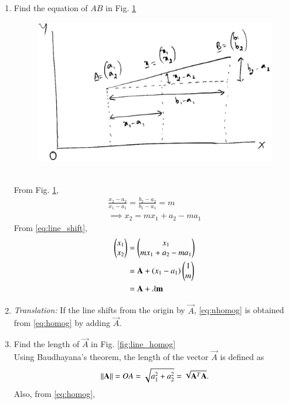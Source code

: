\begin{enumerate}[label=\arabic*.,ref=\thesubsection.\theenumi]
\item Find the equation of $AB$ in Fig. \ref{fig:line_nhomog}
\begin{figure}
\centering
\includegraphics[width=\columnwidth]{./figs/line_nhomog.eps}
\caption{}
\label{fig:line_nhomog}
\end{figure}
\\
\solution 
From Fig. \ref{fig:line_nhomog}, 
%
\begin{align}
\frac{x_2-a_2}{x_1-a_1} = \frac{b_2-a_2}{b_1-a_1} = m
\\
\implies x_2 = m x_1 + a_2-ma_1
\label{eq:line_shift}
\end{align}
%
From \eqref{eq:line_shift},
\begin{align}
\begin{pmatrix}x_1 \\ x_2\end{pmatrix} &= 
\begin{pmatrix}x_1 \\   m x_1 + a_2-ma_1
\end{pmatrix} 
\\
&=\mathbf{A} + \left(x_1-a_1\right)  \begin{pmatrix}1 \\ m\end{pmatrix}
\\
&=\mathbf{A} + \lambda  \mathbf{m}
\label{eq:nhomog}
\end{align}
\item {\em Translation:} If the line shifts from the origin by $\vec{A}$, \eqref{eq:nhomog} is obtained from \eqref{eq:homog} by adding $\vec{A}$.
\item Find the length of $\vec{A}$ in Fig. \ref{fig:line_homog}
\\
\solution Using Baudhayana's theorem, the length of the vector $\vec{A}$ is defined as
\begin{equation}
 \lVert\mathbf{A}\rVert = OA = \sqrt{a_1^2 + a_2^2}
=\sqrt{\mathbf{A}^T\mathbf{A}}.
\end{equation}
%
Also, from \eqref{eq:homog}, 
\begin{equation}

\end{equation}
\end{enumerate}
